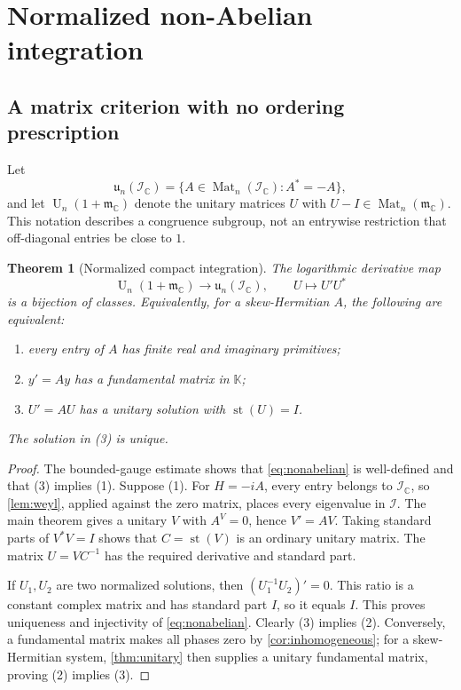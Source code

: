 \documentclass[11pt,a4paper]{article}
\numberwithin{equation}{section}
\newtheorem{theorem}{Theorem}[section]
\theoremstyle{definition}
\theoremstyle{remark}
\newcommand{\K}{\mathbb K}
\newcommand{\C}{\mathbb C}
\newcommand{\mm}{\mathfrak m}
\newcommand{\II}{\mathcal I}
\newcommand{\st}{\operatorname{st}}
\newcommand{\UU}{\operatorname U}
\newcommand{\Mat}{\operatorname{Mat}}
\begin{document}
\section{Normalized non-Abelian integration}\label{sec:nonabelian}

\subsection{A matrix criterion with no ordering prescription}
Let
\[
 \mathfrak u_n(\II_{\C})
   =\{A\in\Mat_n(\II_{\C}):A^*=-A\},
\]
and let $\UU_n(1+\mm_{\C})$ denote the unitary matrices $U$ with
$U-I\in\Mat_n(\mm_{\C})$. This notation describes a congruence subgroup,
not an entrywise restriction that off-diagonal entries be close to $1$.

\begin{theorem}[Normalized compact integration]\label{thm:nonabelian}
The logarithmic derivative map
\begin{equation}\label{eq:nonabelian}
 \UU_n(1+\mm_{\C})\longrightarrow\mathfrak u_n(\II_{\C}),
 \qquad U\longmapsto U'U^*
\end{equation}
is a bijection of classes. Equivalently, for a skew-Hermitian $A$, the
following are equivalent:
\begin{enumerate}
\item every entry of $A$ has finite real and imaginary primitives;
\item $y'=Ay$ has a fundamental matrix in $\K$;
\item $U'=AU$ has a unitary solution with $\st(U)=I$.
\end{enumerate}
The solution in (3) is unique.
\end{theorem}
\begin{proof}
The bounded-gauge estimate shows that \eqref{eq:nonabelian} is well-defined
and that (3) implies (1). Suppose (1). For $H=-iA$, every entry belongs to
$\II_{\C}$, so \cref{lem:weyl}, applied against the zero matrix, places
every eigenvalue in $\II$. The main theorem gives a unitary $V$ with
$A^V=0$, hence $V'=AV$. Taking standard parts of $V^*V=I$ shows that
$C=\st(V)$ is an ordinary unitary matrix. The matrix $U=VC^{-1}$ has the
required derivative and standard part.

If $U_1,U_2$ are two normalized solutions, then
$(U_1^{-1}U_2)'=0$. This ratio is a constant complex matrix and has standard
part $I$, so it equals $I$. This proves uniqueness and injectivity of
\eqref{eq:nonabelian}. Clearly (3) implies (2). Conversely, a fundamental
matrix makes all phases zero by \cref{cor:inhomogeneous}; for a
skew-Hermitian system, \cref{thm:unitary} then supplies a unitary
fundamental matrix, proving (2) implies (3).
\end{proof}
\end{document}
